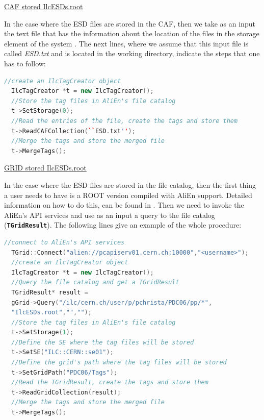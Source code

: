 \documentclass[12pt,a4paper,twoside]{article}
\newcommand{\class}[1]{\texttt{\textbf{#1}}\xspace}
\begin{document}
{\underline{CAF stored IlcESDs.root}

In the case where the ESD files are stored in the CAF, then we take as
an input the text file that has the information about the location of
the files in the storage element of the system \cite{EventTagWeb,
  CAF}. The next lines, where we assume that this input file is called
\emph{ESD.txt} and is located in the working directory, indicate the
steps that one has to follow:


\begin{lstlisting}[language=C++]
  //create an IlcTagCreator object
  IlcTagCreator *t = new IlcTagCreator(); 
  //Store the tag files in AliEn's file catalog
  t->SetStorage(0);
  //Read the entries of the file, create the tags and store them
  t->ReadCAFCollection(``ESD.txt'');
  //Merge the tags and store the merged file
  t->MergeTags();
\end{lstlisting}

\underline{GRID stored IlcESDs.root}

In the case where the ESD files are stored in the file catalog, then
the first thing a user needs to have is a ROOT version compiled with
AliEn support. Detailed information on how to do this, can be found in
\cite{RootApi}. Then we need to invoke the AliEn's API services
\cite{RootApi} and use as an input a query to the file catalog
(\class{TGridResult}). The following lines give an example of the
whole procedure:

 
\begin{lstlisting}[language=C++]
  //connect to AliEn's API services
  TGrid::Connect("alien://pcapiserv01.cern.ch:10000","<username>");   
  //create an IlcTagCreator object
  IlcTagCreator *t = new IlcTagCreator(); 
  //Query the file catalog and get a TGridResult
  TGridResult* result = 
  gGrid->Query("/ilc/cern.ch/user/p/pchrista/PDC06/pp/*",
  "IlcESDs.root","","");
  //Store the tag files in AliEn's file catalog
  t->SetStorage(1);
  //Define the SE where the tag files will be stored
  t->SetSE("ILC::CERN::se01");
  //Define the grid's path where the tag files will be stored
  t->SetGridPath("PDC06/Tags");
  //Read the TGridResult, create the tags and store them
  t->ReadGridCollection(result);
  //Merge the tags and store the merged file
  t->MergeTags();
\end{lstlisting}




\newpage
\appendix

}
\end{document}

